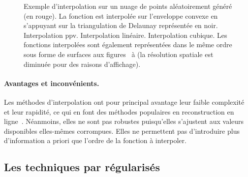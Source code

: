 \begin{figure}[h]
    \caption{Exemple d'interpolation sur un nuage de points aléatoirement généré (en rouge). La fonction est interpolée sur l'enveloppe convexe en s'appuyant sur la triangulation de Delaunay représentée en noir. \protect{} Interpolation \gls{ppv}. \protect{} Interpolation linéaire. \protect{} Interpolation cubique. Les fonctions interpolées sont également représentées dans le même ordre sous forme de surfaces aux figures~ à  (la résolution spatiale est diminuée pour des raisons d'affichage).
        \protect\label{fig-interpolation}}
\end{figure}


\paragraph{Avantages et inconvénients.} Les méthodes d'interpolation ont pour principal avantage leur faible complexité et leur rapidité, ce qui en font des méthodes populaires en reconstruction en ligne~\cite{sibson1981interpreting, cazals2006delaunay, trampert2018ultramicroscopy}. Néanmoins, elles ne sont pas robustes puisqu'elles s'ajustent aux valeurs disponibles elles-mêmes corrompues. Elles ne permettent pas d'introduire plus d'information a priori que l'ordre de la fonction à interpoler.

\subsection{Les techniques par  régularisés}\label{sec-MC-regul}

